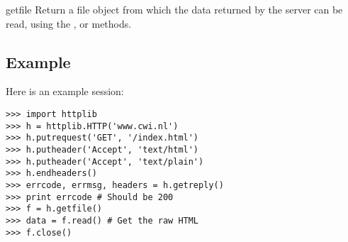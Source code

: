 \begin{methoddesc}{getfile}{}
Return a file object from which the data returned by the server can be
read, using the ,  or
 methods.
\end{methoddesc}

\subsection{Example}

Here is an example session:

\begin{verbatim}
>>> import httplib
>>> h = httplib.HTTP('www.cwi.nl')
>>> h.putrequest('GET', '/index.html')
>>> h.putheader('Accept', 'text/html')
>>> h.putheader('Accept', 'text/plain')
>>> h.endheaders()
>>> errcode, errmsg, headers = h.getreply()
>>> print errcode # Should be 200
>>> f = h.getfile()
>>> data = f.read() # Get the raw HTML
>>> f.close()
\end{verbatim}
